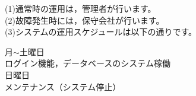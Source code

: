 \begin{minipage}[h]{150mm}
(1)通常時の運用は，管理者が行います。\\
(2)故障発生時には，保守会社が行います。\\
(3)システムの運用スケジュールは以下の通りです。\\
\end{minipage}

\hspace{1cm}
\begin{minipage}[h]{140mm}
月$\sim$土曜日\\
\hspace{5mm}
ログイン機能，データベースのシステム稼働\\
日曜日\\
\hspace{5mm}
メンテナンス（システム停止） \\
\end{minipage}
